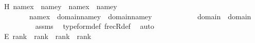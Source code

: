 \begin{isabellebody}
\ H{\isacharcolon}{\kern0pt}\ {\isachardoublequoteopen}name{}{\isacharparenleft}{\kern0pt}x{\isacharparenright}{\kern0pt}\ {\isacharequal}{\kern0pt}\ name{}{\isacharparenleft}{\kern0pt}y{\isacharparenright}{\kern0pt}\ {\isasymor}\ name{}{\isacharparenleft}{\kern0pt}x{\isacharparenright}{\kern0pt}\ {\isacharequal}{\kern0pt}\ name{}{\isacharparenleft}{\kern0pt}y{\isacharparenright}{\kern0pt}\ {\isachardoublequoteclose}\ {\isacharparenleft}{\kern0pt}\ {\isachardoublequoteopen}{\isacharquery}{\kern0pt}{\isasymtau}\ {\isacharequal}{\kern0pt}\ {\isacharquery}{\kern0pt}{\isasymsigma}{\isacharprime}{\kern0pt}\ {\isasymor}\ {\isacharquery}{\kern0pt}{\isasymtau}\ {\isacharequal}{\kern0pt}\ {\isacharquery}{\kern0pt}{\isasymtau}{\isacharprime}{\kern0pt}{\isachardoublequoteclose}{\isacharparenright}{\kern0pt}\isanewline
\ \ \ \ \ \ \ \ {\isachardoublequoteopen}name{}{\isacharparenleft}{\kern0pt}x{\isacharparenright}{\kern0pt}\ {\isasymin}\ domain{\isacharparenleft}{\kern0pt}name{}{\isacharparenleft}{\kern0pt}y{\isacharparenright}{\kern0pt}{\isacharparenright}{\kern0pt}\ {\isasymunion}\ domain{\isacharparenleft}{\kern0pt}name{}{\isacharparenleft}{\kern0pt}y{\isacharparenright}{\kern0pt}{\isacharparenright}{\kern0pt}{\isachardoublequoteclose}\ \isanewline
\ \ \ \ \ \ \ \ {\isacharparenleft}{\kern0pt}\ {\isachardoublequoteopen}{\isacharquery}{\kern0pt}{\isasymsigma}\ {\isasymin}\ domain{\isacharparenleft}{\kern0pt}{\isacharquery}{\kern0pt}{\isasymsigma}{\isacharprime}{\kern0pt}{\isacharparenright}{\kern0pt}\ {\isasymunion}\ domain{\isacharparenleft}{\kern0pt}{\isacharquery}{\kern0pt}{\isasymtau}{\isacharprime}{\kern0pt}{\isacharparenright}{\kern0pt}{\isachardoublequoteclose}{\isacharparenright}{\kern0pt}\isanewline
\ \ \ \ \ \ \ \ \isamarkupfalse%
\ assms\ \isamarkupfalse%
\ type{\isacharunderscore}{\kern0pt}form{\isacharunderscore}{\kern0pt}def\ frecR{\isacharunderscore}{\kern0pt}def\ \isamarkupfalse%
\ auto\isanewline
\ \ \ \ \ \ \isamarkupfalse%
\ \isanewline
\ \ \ \ \ \ \isamarkupfalse%
\ E{\isacharcolon}{\kern0pt}\ {\isachardoublequoteopen}rank{\isacharparenleft}{\kern0pt}{\isacharquery}{\kern0pt}{\isasymtau}{\isacharparenright}{\kern0pt}\ {\isacharequal}{\kern0pt}\ rank{\isacharparenleft}{\kern0pt}{\isacharquery}{\kern0pt}{\isasymsigma}{\isacharprime}{\kern0pt}{\isacharparenright}{\kern0pt}\ {\isasymor}\ rank{\isacharparenleft}{\kern0pt}{\isacharquery}{\kern0pt}{\isasymtau}{\isacharparenright}{\kern0pt}\ {\isacharequal}{\kern0pt}\ rank{\isacharparenleft}{\kern0pt}{\isacharquery}{\kern0pt}{\isasymtau}{\isacharprime}{\kern0pt}{\isacharparenright}{\kern0pt}{\isachardoublequoteclose}\ \isamarkupfalse%

\end{isabellebody}
